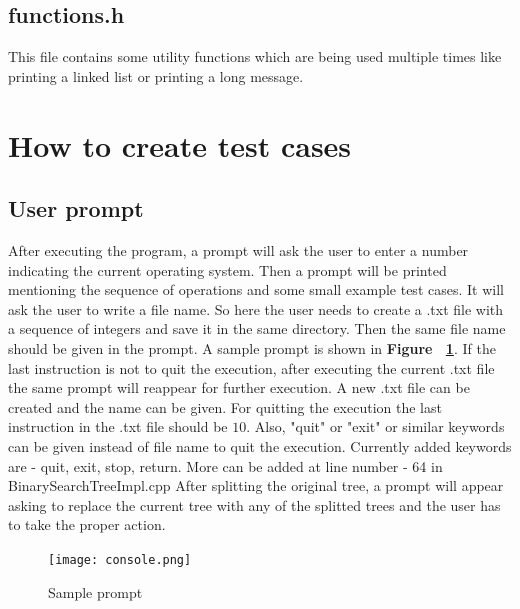 \documentclass{article}
\begin{document}
\subsection{functions.h}
This file contains some utility functions which are being used multiple times like printing a linked list or printing a long message.

\section{How to create test cases}
\subsection{User prompt}
After executing the program, a prompt will ask the user to enter a number indicating the current operating system. Then a prompt will be printed mentioning the sequence of operations and some small example test cases. It will ask the user to write a file name. So here the user needs to create a .txt file with a sequence of integers and save it in the same directory. Then the same file name should be given in the prompt. A sample prompt is shown in \textbf{Figure ~\ref{fig:ex5}}. If the last instruction is not to quit the execution, after executing the current .txt file the same prompt will reappear for further execution. A new .txt file can be created and the name can be given. For quitting the execution the last instruction in the .txt file should be $10$. Also, "quit" or "exit" or similar keywords can be given instead of file name to quit the execution. Currently added keywords are - quit, exit, stop, return. More can be added at line number - 64 in BinarySearchTreeImpl.cpp\newline
After splitting the original tree, a prompt will appear asking to replace the current tree with any of the splitted trees and the user has to take the proper action.
\begin{figure}
\texttt{[image: console.png]}
\caption{Sample prompt}
\label{fig:ex5}
\end{figure}
\end{document}
